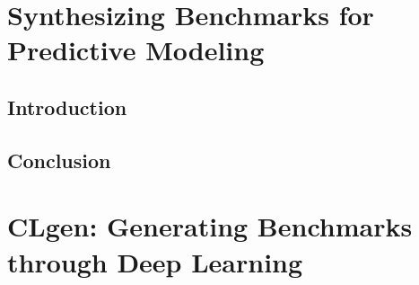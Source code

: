 \ifstapled
\chapter{Synthesizing Benchmarks for Predictive Modeling}
\section{Introduction}
\lipsum[1-2]

\section{Conclusion}
\lipsum[1-2]
\else
\chapter{CLgen: Generating Benchmarks through Deep Learning}









\fi